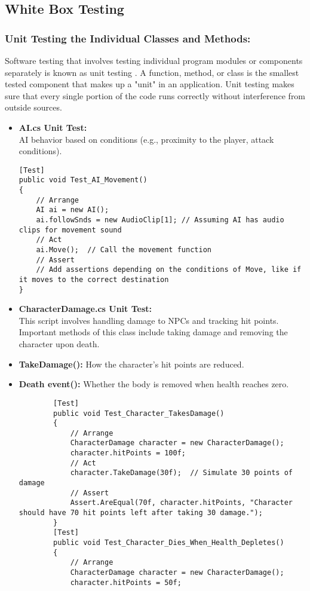\subsection{White Box Testing}
\subsubsection{Unit Testing the Individual Classes and Methods:} 
Software testing that involves testing individual program modules or components separately is known as unit testing \cite{fowler_unit_test}. A function, method, or class is the smallest tested component that makes up a "unit" in an application. Unit testing makes sure that every single portion of the code runs correctly without interference from outside sources.
\begin{itemize}
	\item  \textbf{AI.cs Unit Test:}
	\\
	AI behavior based on conditions (e.g., proximity to the player, attack conditions).
	\begin{lstlisting}
[Test]
public void Test_AI_Movement()
{
	// Arrange
	AI ai = new AI();
	ai.followSnds = new AudioClip[1]; // Assuming AI has audio clips for movement sound
	// Act
	ai.Move();  // Call the movement function
	// Assert
	// Add assertions depending on the conditions of Move, like if it moves to the correct destination
}
	\end{lstlisting}
	\item  \textbf{CharacterDamage.cs Unit Test:}
	\\
	This script involves handling damage to NPCs and tracking hit points. Important methods of this class include taking damage and removing the character upon death.
	\item \textbf{TakeDamage():} How the character's hit points are reduced.
	\item \textbf{Death event():} Whether the body is removed when health reaches zero.
	\begin{lstlisting}
		[Test]
		public void Test_Character_TakesDamage()
		{
			// Arrange
			CharacterDamage character = new CharacterDamage();
			character.hitPoints = 100f;
			// Act
			character.TakeDamage(30f);  // Simulate 30 points of damage
			// Assert
			Assert.AreEqual(70f, character.hitPoints, "Character should have 70 hit points left after taking 30 damage.");
		}
		[Test]
		public void Test_Character_Dies_When_Health_Depletes()
		{
			// Arrange
			CharacterDamage character = new CharacterDamage();
			character.hitPoints = 50f;

\end{lstlisting}
\end{itemize}

